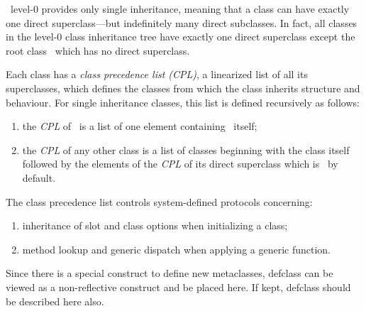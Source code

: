 \begin{optDefinition}
\noindent
\telos\ level-0 provides only single
inheritance, meaning that a class can have exactly one direct
superclass---but indefinitely many direct subclasses.  In fact, all classes in
the level-0 class inheritance tree have exactly one direct superclass except the
root class \ which has no direct superclass.

Each class has a {\em class precedence list (CPL)}, a linearized list of all its
superclasses, which defines the classes from which the class inherits structure
and behaviour. For single inheritance classes, this list is defined recursively
as follows:
\begin{enumerate}
    \item the {\em CPL\/} of \ is a list of one element containing
    \ itself;
    \item the {\em CPL\/} of any other class is a list of classes beginning with
    the class itself followed by the elements of the {\em CPL\/} of its direct
    superclass which is \ by default.
\end{enumerate}

The class precedence list controls system-defined protocols
concerning:
\begin{enumerate}
    \item inheritance of slot and class options when initializing a class;
    \item method lookup and generic dispatch when applying a generic function.
\end{enumerate}
\end{optDefinition}

\begin{optPrivate}
Since there is a special construct to define new metaclasses, defclass
can be viewed as a non-reflective construct and be placed here.  If
kept, defclass should be described here also.
\end{optPrivate}

